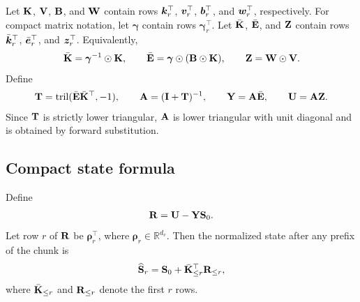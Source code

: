 Let ${\mathbf{K}}$, ${\mathbf{V}}$, ${\mathbf{B}}$, and ${\mathbf{W}}$ contain rows ${\bm{k}}_r^\top$, ${\bm{v}}_r^\top$, ${\bm{b}}_r^\top$, and ${\bm{w}}_r^\top$, respectively. For compact matrix notation, let $\boldsymbol{\gamma}$ contain rows $\boldsymbol{\gamma}_r^\top$. Let $\bar{{\mathbf{K}}}$, $\bar{{\mathbf{E}}}$, and ${\mathbf{Z}}$ contain rows $\bar{{\bm{k}}}_r^\top$, $\bar{{\bm{e}}}_r^\top$, and ${\bm{z}}_r^\top$. Equivalently,
\begin{align}
    \bar{{\mathbf{K}}}
    =
    \boldsymbol{\gamma}^{-1}\odot{\mathbf{K}},
    \qquad
    \bar{{\mathbf{E}}}
    =
    \boldsymbol{\gamma}\odot({\mathbf{B}}\odot{\mathbf{K}}),
    \qquad
    {\mathbf{Z}}
    =
    {\mathbf{W}}\odot{\mathbf{V}} .
\label{eq_app_gate_matrices}
\end{align}
Define
\begin{align}
    {\mathbf{T}} = \operatorname{tril}(\bar{{\mathbf{E}}}\bar{{\mathbf{K}}}^\top, -1),
    \qquad
    {\mathbf{A}} = ({\mathbf{I}} + {\mathbf{T}})^{-1},
    \qquad
    {\mathbf{Y}} = {\mathbf{A}}\bar{{\mathbf{E}}},
    \qquad
    {\mathbf{U}} = {\mathbf{A}}{\mathbf{Z}} .
\label{eq_app_wy_definitions}
\end{align}
Since ${\mathbf{T}}$ is strictly lower triangular, ${\mathbf{A}}$ is lower triangular with unit diagonal and is obtained by forward substitution.

\subsection{Compact state formula}
\label{app_state_formula}

Define
\begin{align}
    {\mathbf{R}} = {\mathbf{U}} - {\mathbf{Y}}{\mathbf{S}}_0 .
\label{eq_app_residual_matrix}
\end{align}
Let row $r$ of ${\mathbf{R}}$ be $\boldsymbol{\rho}_r^\top$, where $\boldsymbol{\rho}_r\in\mathbb{R}^{d_v}$. Then the normalized state after any prefix of the chunk is
\begin{align}
    \widehat{{\mathbf{S}}}_r
    =
    {\mathbf{S}}_0
    +
    \bar{{\mathbf{K}}}_{\le r}^{\top}{\mathbf{R}}_{\le r},
\label{eq_app_prefix_state}
\end{align}
where $\bar{{\mathbf{K}}}_{\le r}$ and ${\mathbf{R}}_{\le r}$ denote the first $r$ rows.

